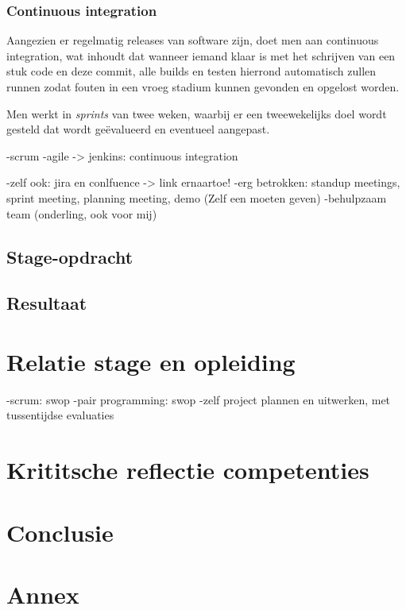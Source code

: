 \documentclass[10pt,a4paper]{article}
\begin{document}
\subsubsection{Continuous integration}
Aangezien er regelmatig releases van software zijn, doet men aan continuous integration, wat inhoudt dat wanneer iemand klaar is met het schrijven van een stuk code en deze commit, alle builds en testen hierrond automatisch zullen runnen zodat fouten in een vroeg stadium kunnen gevonden en opgelost worden.


Men werkt in \textit{sprints} van twee weken, waarbij er een tweewekelijks doel wordt gesteld dat wordt ge\"evalueerd en eventueel aangepast.

-scrum
-agile
-> jenkins: continuous integration

-zelf ook: jira en conlfuence -> link ernaartoe!
-erg betrokken: standup meetings, sprint meeting, planning meeting, demo (Zelf een moeten geven)
-behulpzaam team (onderling, ook voor mij)
\subsection{Stage-opdracht}
\subsection{Resultaat}

\section{Relatie stage en opleiding}
-scrum: swop
-pair programming: swop
-zelf project plannen en uitwerken, met tussentijdse evaluaties
\section{Krititsche reflectie competenties}

\section{Conclusie}

\section{Annex}
\end{document}
